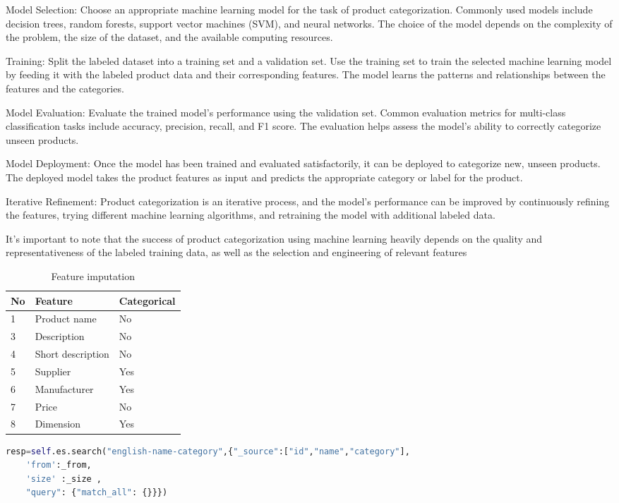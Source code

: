 Model Selection: Choose an appropriate machine learning model for the task of product categorization. Commonly used models include decision trees, random forests, support vector machines (SVM), and neural networks. The choice of the model depends on the complexity of the problem, the size of the dataset, and the available computing resources.

Training: Split the labeled dataset into a training set and a validation set. Use the training set to train the selected machine learning model by feeding it with the labeled product data and their corresponding features. The model learns the patterns and relationships between the features and the categories.

Model Evaluation: Evaluate the trained model's performance using the validation set. Common evaluation metrics for multi-class classification tasks include accuracy, precision, recall, and F1 score. The evaluation helps assess the model's ability to correctly categorize unseen products.

Model Deployment: Once the model has been trained and evaluated satisfactorily, it can be deployed to categorize new, unseen products. The deployed model takes the product features as input and predicts the appropriate category or label for the product.

Iterative Refinement: Product categorization is an iterative process, and the model's performance can be improved by continuously refining the features, trying different machine learning algorithms, and retraining the model with additional labeled data.

It's important to note that the success of product categorization using machine learning heavily depends on the quality and representativeness of the labeled training data, as well as the selection and engineering of relevant features


\begin{table}[h]
    \centering
    \caption{Feature imputation}
    \label{table:feature_imputation}
    \begin{tabular}{ lll }
          \toprule
          
          \textbf{No}& \textbf{Feature} & \textbf{Categorical}\\
          \midrule
          1&Product name & No\\
          3&Description & No\\         
          4&Short description  & No\\
          5&Supplier  & Yes\\
          6&Manufacturer  &  Yes\\           
          7&Price  &  No \\
          8&Dimension  & Yes\\
          \bottomrule
          \end{tabular}
\end{table}


\begin{lstlisting}[language=Python]
    resp=self.es.search("english-name-category",{"_source":["id","name","category"],
    'from':_from,
    'size' :_size ,
    "query": {"match_all": {}}})
\end{lstlisting}

